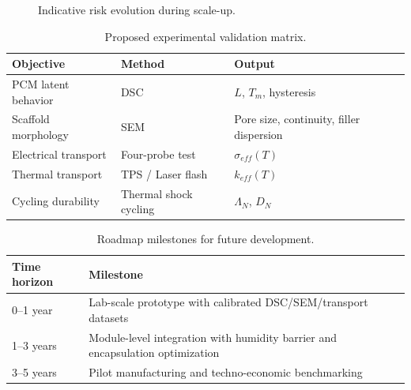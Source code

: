 \begin{figure}[htbp]
\centering
{}
\caption{Indicative risk evolution during scale-up.}
\label{fig:future_risk}
\end{figure}

\begin{table}[htbp]
\centering
\caption{Proposed experimental validation matrix.}
\label{tab:validation_matrix}
\begin{tabular}{lll}
\toprule
Objective & Method & Output \\
\midrule
PCM latent behavior & DSC & $L$, $T_m$, hysteresis \\
Scaffold morphology & SEM & Pore size, continuity, filler dispersion \\
Electrical transport & Four-probe test & $\sigma_{eff}(T)$ \\
Thermal transport & TPS / Laser flash & $k_{eff}(T)$ \\
Cycling durability & Thermal shock cycling & $\Lambda_N$, $D_N$ \\
\bottomrule
\end{tabular}
\end{table}

\begin{table}[htbp]
\centering
\caption{Roadmap milestones for future development.}
\label{tab:future_roadmap}
\begin{tabular}{p{3.5cm}p{8cm}}
\toprule
Time horizon & Milestone \\
\midrule
0--1 year & Lab-scale prototype with calibrated DSC/SEM/transport datasets \\
1--3 years & Module-level integration with humidity barrier and encapsulation optimization \\
3--5 years & Pilot manufacturing and techno-economic benchmarking \\
\bottomrule
\end{tabular}
\end{table}
